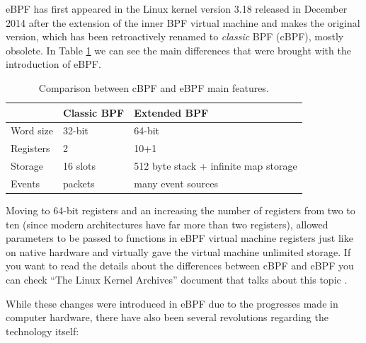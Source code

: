 eBPF has first appeared in the Linux kernel version 3.18 released in December 2014 after the extension of the inner BPF virtual machine and makes the original version, which has been retroactively renamed to \textit{classic} BPF (cBPF), mostly obsolete.
In Table \ref{table:cBPF_vs_eBPF} we can see the main differences that were brought with the introduction of eBPF.

\begin{table}[h]
	\centering
	\begin{tabular}{|| l | l | l ||} 
		\hline
		& Classic BPF & Extended BPF \\
		\hline
		\hline
		Word size & 32-bit & 64-bit \\
		\hline
		Registers & 2 & 10+1 \\
		\hline
		Storage & 16 slots & 512 byte stack + infinite map storage \\	
		\hline
		Events & packets & many event sources \\
		\hline
	\end{tabular}
	\caption{Comparison between cBPF and eBPF main features.}
	\label{table:cBPF_vs_eBPF}
\end{table}

Moving to 64-bit registers and an increasing the number of registers from two to ten (since modern architectures have far more than two registers), allowed parameters to be passed to functions in eBPF virtual machine registers just like on native hardware and virtually gave the virtual machine unlimited storage.
If you want to read the details about the differences between cBPF and eBPF you can check ``The Linux Kernel Archives'' document that talks about this topic \cite{cBPFvseBPF}.

While these changes were introduced in eBPF due to the progresses made in computer hardware, there have also been several revolutions regarding the technology itself:

